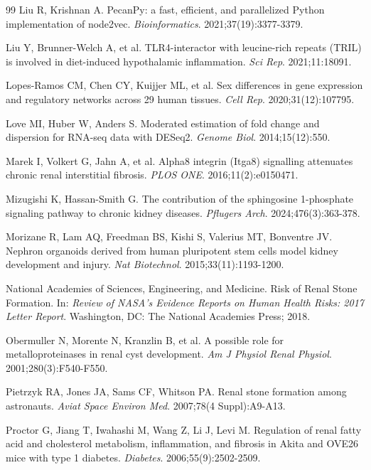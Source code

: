 \documentclass[11pt]{article}
\begin{document}
\begin{thebibliography}{99}
 Liu R, Krishnan A. PecanPy: a fast, efficient, and parallelized Python implementation of node2vec. \emph{Bioinformatics}. 2021;37(19):3377-3379.

 Liu Y, Brunner-Welch A, et al. TLR4-interactor with leucine-rich repeats (TRIL) is involved in diet-induced hypothalamic inflammation. \emph{Sci Rep}. 2021;11:18091.

 Lopes-Ramos CM, Chen CY, Kuijjer ML, et al. Sex differences in gene expression and regulatory networks across 29 human tissues. \emph{Cell Rep}. 2020;31(12):107795.

 Love MI, Huber W, Anders S. Moderated estimation of fold change and dispersion for RNA-seq data with DESeq2. \emph{Genome Biol}. 2014;15(12):550.

 Marek I, Volkert G, Jahn A, et al. Alpha8 integrin (Itga8) signalling attenuates chronic renal interstitial fibrosis. \emph{PLOS ONE}. 2016;11(2):e0150471.

 Mizugishi K, Hassan-Smith G. The contribution of the sphingosine 1-phosphate signaling pathway to chronic kidney diseases. \emph{Pflugers Arch}. 2024;476(3):363-378.

 Morizane R, Lam AQ, Freedman BS, Kishi S, Valerius MT, Bonventre JV. Nephron organoids derived from human pluripotent stem cells model kidney development and injury. \emph{Nat Biotechnol}. 2015;33(11):1193-1200.

 National Academies of Sciences, Engineering, and Medicine. Risk of Renal Stone Formation. In: \emph{Review of NASA's Evidence Reports on Human Health Risks: 2017 Letter Report}. Washington, DC: The National Academies Press; 2018.

 Obermuller N, Morente N, Kranzlin B, et al. A possible role for metalloproteinases in renal cyst development. \emph{Am J Physiol Renal Physiol}. 2001;280(3):F540-F550.

 Pietrzyk RA, Jones JA, Sams CF, Whitson PA. Renal stone formation among astronauts. \emph{Aviat Space Environ Med}. 2007;78(4 Suppl):A9-A13.

 Proctor G, Jiang T, Iwahashi M, Wang Z, Li J, Levi M. Regulation of renal fatty acid and cholesterol metabolism, inflammation, and fibrosis in Akita and OVE26 mice with type 1 diabetes. \emph{Diabetes}. 2006;55(9):2502-2509.


\end{thebibliography}
\end{document}
